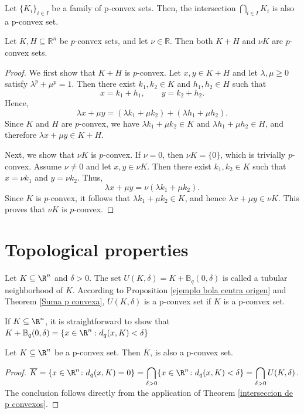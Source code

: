 \documentclass[10pt]{article}
\begin{document}
\begin{theorem}
Let $\{K_{i}\}_{i\in I}$ be a family of p-convex sets. Then, the intersection $\displaystyle \bigcap_{i\in I}K_{i}$ is also
a p-convex set.
\label{interseccion de p convexos}
\end{theorem}
\begin{theorem}
Let $K,H \subseteq \mathbb{R}^{n}$ be $p$-convex sets, and let $\nu \in \mathbb{R}$. Then both
$K+H$ and $\nu K$ are $p$-convex sets.
\label{Suma p convexa}
\end{theorem}

\begin{proof}
We first show that $K+H$ is $p$-convex.  
Let $x,y \in K+H$ and let $\lambda,\mu \geq 0$ satisfy $\lambda^{p}+\mu^{p}=1$. Then there exist
$k_{1},k_{2} \in K$ and $h_{1},h_{2} \in H$ such that
\[
x = k_{1}+h_{1}, \qquad y = k_{2}+h_{2}.
\]
Hence,
\[
\lambda x + \mu y
= (\lambda k_{1} + \mu k_{2}) + (\lambda h_{1} + \mu h_{2}).
\]
Since $K$ and $H$ are $p$-convex, we have
\(\lambda k_{1} + \mu k_{2} \in K\) and
\(\lambda h_{1} + \mu h_{2} \in H\), and therefore
\(\lambda x + \mu y \in K+H\).

Next, we show that $\nu K$ is $p$-convex.  
If $\nu = 0$, then $\nu K = \{0\}$, which is trivially $p$-convex.  
Assume $\nu \neq 0$ and let $x,y \in \nu K$. Then there exist $k_{1},k_{2} \in K$ such that
$x=\nu k_{1}$ and $y=\nu k_{2}$. Thus,
\[
\lambda x + \mu y
= \nu(\lambda k_{1} + \mu k_{2}).
\]
Since $K$ is $p$-convex, it follows that
\(\lambda k_{1} + \mu k_{2} \in K\), and hence
\(\lambda x + \mu y \in \nu K\).
This proves that $\nu K$ is $p$-convex.
\end{proof}
\section{Topological properties}
\begin{definition}
 Let $K\subseteq \R^{n}$  and $\delta>0$. The set $U(K,\delta)=K+\mathbb{B}_{q}(0, \delta)$  is called a tubular neighborhood of $K$. According to Proposition \ref{ejemplo bola centra origen} and Theorem \ref{Suma p convexa}, $U(K,\delta)$ is a p-convex set if $K$ is a p-convex set.
\end{definition}
\begin{remark}
If $K\subseteq \R^{n}$, it is straightforward to show that $K+\mathbb{B}_{q}(0,\delta)=\{x\in \R^{n}:d_{q}(x,K)<\delta\}$
\end{remark}
\begin{corollary} Let $K\subseteq \R^{n}$ be a p-convex set. Then $\overline{K}$, is also a  p-convex set.
\end{corollary}
\begin{proof} $\displaystyle \overline{K}=\{x\in \R^{n}\colon d_{q}(x,K)=0\}=\bigcap_{\delta>0}\{x\in \R^{n}\colon d_{q}(x,K)< \delta\}=\bigcap_{\delta>0}U(K,\delta)$. The conclusion follows directly from the application of Theorem \ref{interseccion de p convexos}.
\end{proof}
\end{document}
